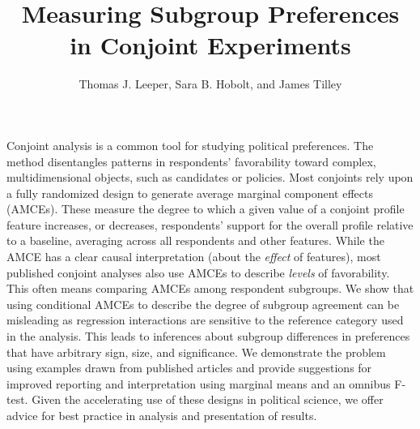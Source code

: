 \documentclass[a4paper,12pt]{article}\usepackage[]{graphicx}\usepackage[]{color}
\title{Measuring Subgroup Preferences in Conjoint Experiments%
}
\author{Thomas J. Leeper, Sara B. Hobolt, and James Tilley}
\begin{document}
\maketitle

{\abstract Conjoint analysis is a common tool for studying political preferences. The method disentangles patterns in respondents' favorability toward complex, multidimensional objects, such as candidates or policies. Most conjoints rely upon a fully randomized design to generate average marginal component effects (AMCEs). These measure the degree to which a given value of a conjoint profile feature increases, or decreases, respondents' support for the overall profile relative to a baseline, averaging across all respondents and other features. While the AMCE has a clear causal interpretation (about the \textit{effect} of features), most published conjoint analyses also use AMCEs to describe \textit{levels} of favorability. This often means comparing AMCEs among respondent subgroups. We show that using conditional AMCEs to describe the degree of subgroup agreement can be misleading as regression interactions are sensitive to the reference category used in the analysis. This leads to inferences about subgroup differences in preferences that have arbitrary sign, size, and significance. We demonstrate the problem using examples drawn from published articles and provide suggestions for improved reporting and interpretation using marginal means and an omnibus F-test. Given the accelerating use of these designs in political science, we offer advice for best practice in analysis and presentation of results.}
















\clearpage
\doublespacing
\end{document}
